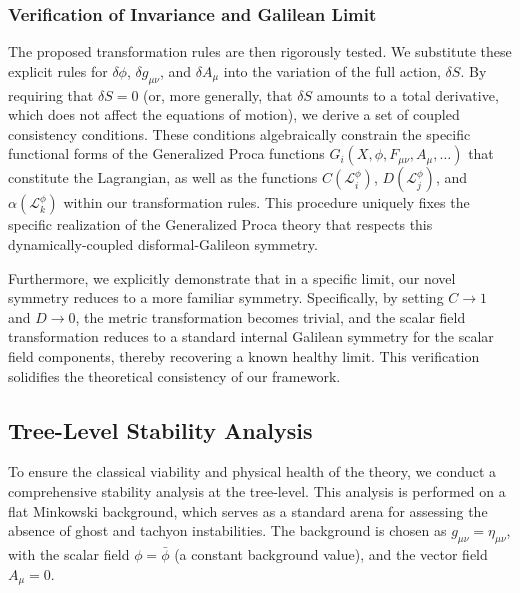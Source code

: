 \documentclass[twocolumn]{aastex631}
\begin{document}
\subsubsection{Verification of Invariance and Galilean Limit}
The proposed transformation rules are then rigorously tested. We substitute these explicit rules for $\delta \phi$, $\delta g_{\mu\nu}$, and $\delta A_\mu$ into the variation of the full action, $\delta S$. By requiring that $\delta S = 0$ (or, more generally, that $\delta S$ amounts to a total derivative, which does not affect the equations of motion), we derive a set of coupled consistency conditions. These conditions algebraically constrain the specific functional forms of the Generalized Proca functions $G_i(X, \phi, F_{\mu\nu}, A_\mu, \dots)$ that constitute the Lagrangian, as well as the functions $C(\mathcal{L}_i^\phi)$, $D(\mathcal{L}_j^\phi)$, and $\alpha(\mathcal{L}_k^\phi)$ within our transformation rules. This procedure uniquely fixes the specific realization of the Generalized Proca theory that respects this dynamically-coupled disformal-Galileon symmetry.

Furthermore, we explicitly demonstrate that in a specific limit, our novel symmetry reduces to a more familiar symmetry. Specifically, by setting $C \to 1$ and $D \to 0$, the metric transformation becomes trivial, and the scalar field transformation reduces to a standard internal Galilean symmetry for the scalar field components, thereby recovering a known healthy limit. This verification solidifies the theoretical consistency of our framework.

\subsection{Tree-Level Stability Analysis}

To ensure the classical viability and physical health of the theory, we conduct a comprehensive stability analysis at the tree-level. This analysis is performed on a flat Minkowski background, which serves as a standard arena for assessing the absence of ghost and tachyon instabilities. The background is chosen as $g_{\mu\nu} = \eta_{\mu\nu}$, with the scalar field $\phi = \bar{\phi}$ (a constant background value), and the vector field $A_\mu = 0$.
\end{document}
